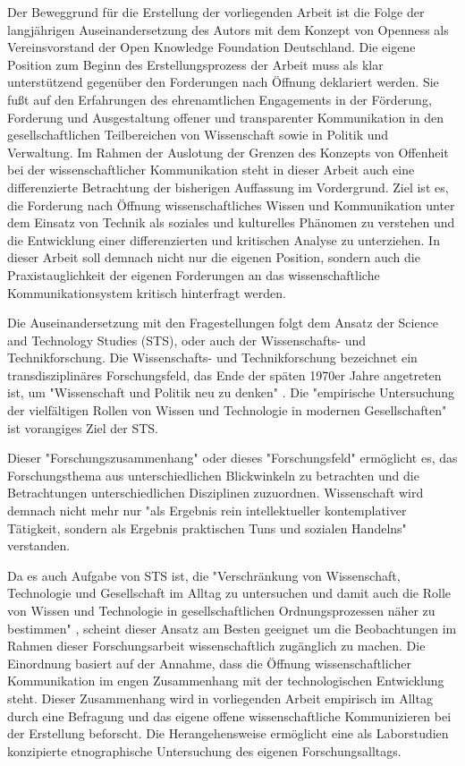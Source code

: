 Der Beweggrund für die Erstellung der vorliegenden Arbeit ist die Folge der langjährigen Auseinandersetzung des Autors mit dem Konzept von Openness als Vereinsvorstand der Open Knowledge Foundation Deutschland. Die eigene Position zum Beginn des Erstellungsprozess der Arbeit muss als klar unterstützend gegenüber den Forderungen nach Öffnung deklariert werden. Sie fußt auf den Erfahrungen des ehrenamtlichen Engagements in der Förderung, Forderung und Ausgestaltung offener und transparenter Kommunikation in den gesellschaftlichen Teilbereichen von Wissenschaft sowie in Politik und Verwaltung. Im Rahmen der Auslotung der Grenzen des Konzepts von Offenheit bei der wissenschaftlicher Kommunikation steht in dieser Arbeit auch eine differenzierte Betrachtung der bisherigen Auffassung im Vordergrund. Ziel ist es, die Forderung nach Öffnung wissenschaftliches Wissen und Kommunikation unter dem Einsatz von Technik als soziales und kulturelles Phänomen zu verstehen und die Entwicklung einer differenzierten und kritischen Analyse zu unterziehen. In dieser Arbeit soll demnach nicht nur die eigenen Position, sondern auch die Praxistauglichkeit der eigenen Forderungen an das wissenschaftliche Kommunikationsystem kritisch hinterfragt werden.

Die Auseinandersetzung mit den Fragestellungen folgt dem Ansatz der Science and Technology Studies (STS), oder auch der Wissenschafts- und Technikforschung. Die Wissenschafts- und Technikforschung bezeichnet ein transdisziplinäres Forschungsfeld, das Ende der späten 1970er Jahre angetreten ist, um "Wissenschaft und Politik neu zu denken" \cite{Potthast_2010}. Die "empirische Untersuchung der vielfältigen Rollen von Wissen und Technologie in modernen Gesellschaften"\cite{beck_2014_science} ist vorangiges Ziel der STS.

Dieser "Forschungszusammenhang"\cite{Potthast_2010} oder dieses "Forschungsfeld" \cite{beck_2014_science} ermöglicht es, das Forschungsthema aus unterschiedlichen Blickwinkeln zu betrachten und die Betrachtungen unterschiedlichen Disziplinen zuzuordnen. Wissenschaft wird demnach nicht mehr nur "als Ergebnis rein intellektueller kontemplativer Tätigkeit, sondern als Ergebnis praktischen Tuns und sozialen Handelns" verstanden.

Da es auch Aufgabe von STS ist, die "Verschränkung von Wissenschaft, Technologie und Gesellschaft im Alltag zu untersuchen und damit auch die Rolle von Wissen und Technologie in gesellschaftlichen Ordnungsprozessen näher zu bestimmen" \cite{beck_2014_science}, scheint dieser Ansatz am Besten geeignet um die Beobachtungen im Rahmen dieser Forschungsarbeit wissenschaftlich zugänglich zu machen. Die Einordnung basiert auf der Annahme, dass die Öffnung wissenschaftlicher Kommunikation im engen Zusammenhang mit der technologischen Entwicklung steht. Dieser Zusammenhang wird in vorliegenden Arbeit empirisch im Alltag durch eine Befragung und das eigene offene wissenschaftliche Kommunizieren bei der Erstellung beforscht. Die Herangehensweise ermöglicht eine als Laborstudien konzipierte etnographische Untersuchung des eigenen Forschungsalltags.

